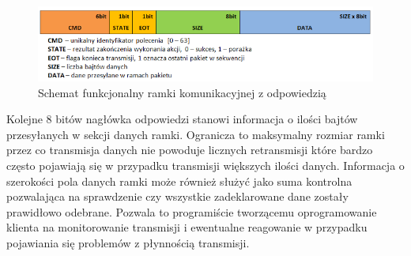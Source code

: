 \begin{figure}[h!] 
 \centering
 \includegraphics[width=\textwidth]{../images/ch05/resp_schema2.png}
 \caption{Schemat funkcjonalny ramki komunikacyjnej z odpowiedzią}
 \label{fig:RfcommRespFrame}
\end{figure}

Kolejne 8 bitów nagłówka odpowiedzi stanowi informacja o ilości bajtów
przesyłanych w sekcji danych ramki. Ogranicza to maksymalny rozmiar ramki przez
co transmisja danych nie powoduje licznych retransmisji które bardzo często
pojawiają się w przypadku transmisji większych ilości danych. Informacja o
szerokości pola danych ramki może również służyć jako suma kontrolna pozwalająca
na sprawdzenie czy wszystkie zadeklarowane dane zostały prawidłowo odebrane.
Pozwala to programiście tworzącemu oprogramowanie klienta na monitorowanie
transmisji i ewentualne reagowanie w przypadku pojawiania się problemów z
płynnością transmisji. 